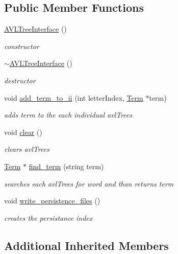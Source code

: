 \subsection*{Public Member Functions}
\begin{DoxyCompactItemize}
\item 
\hyperlink{class_a_v_l_tree_interface_abaec1061e3c1982382aeda27495af568}{A\+V\+L\+Tree\+Interface} ()
\begin{DoxyCompactList}\small\item\em constructor \end{DoxyCompactList}\item 
\hyperlink{class_a_v_l_tree_interface_a919ac950421b6702b2f82b9849b81108}{$\sim$\+A\+V\+L\+Tree\+Interface} ()
\begin{DoxyCompactList}\small\item\em destructor \end{DoxyCompactList}\item 
void \hyperlink{class_a_v_l_tree_interface_a2ff7466f1fd70ce6391330c04749fec7}{add\+\_\+term\+\_\+to\+\_\+ii} (int letter\+Index, \hyperlink{class_term}{Term} $\ast$term)
\begin{DoxyCompactList}\small\item\em adds term to the each individual avl\+Trees \end{DoxyCompactList}\item 
void \hyperlink{class_a_v_l_tree_interface_a748ffc895fb64aab3e2afac287f80630}{clear} ()
\begin{DoxyCompactList}\small\item\em clears avl\+Trees \end{DoxyCompactList}\item 
\hyperlink{class_term}{Term} $\ast$ \hyperlink{class_a_v_l_tree_interface_a35ee941b125e65cf0b5783a687503d83}{find\+\_\+term} (string term)
\begin{DoxyCompactList}\small\item\em searches each avl\+Trees for word and than returns term \end{DoxyCompactList}\item 
void \hyperlink{class_a_v_l_tree_interface_abd7f70746611a3982dc07a1b1880e7b5}{write\+\_\+persistence\+\_\+files} ()
\begin{DoxyCompactList}\small\item\em creates the persistance index \end{DoxyCompactList}\end{DoxyCompactItemize}
\subsection*{Additional Inherited Members}


